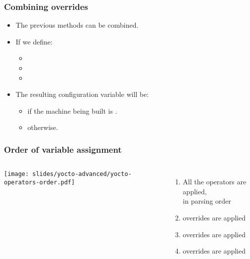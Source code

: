 \begin{frame}
  \frametitle{Combining overrides}
  \begin{itemize}
    \item The previous methods can be combined.
    \item If we define:
      \begin{itemize}
        \item {}
        \item {}
        \item {}
      \end{itemize}
    \item The resulting configuration variable will be:
      \begin{itemize}
        \item {} if the machine being built is
          .
        \item {}
          otherwise.
      \end{itemize}
  \end{itemize}
\end{frame}

\begin{frame}
  \frametitle{Order of variable assignment}
  \begin{columns}
      \texttt{[image: slides/yocto-advanced/yocto-operators-order.pdf]}
      \begin{enumerate}
        \item All the operators are applied,\\
          in parsing order
        \item {} overrides are applied
        \item {} overrides are applied
        \item {} overrides are applied
      \end{enumerate}
  \end{columns}
\end{frame}

